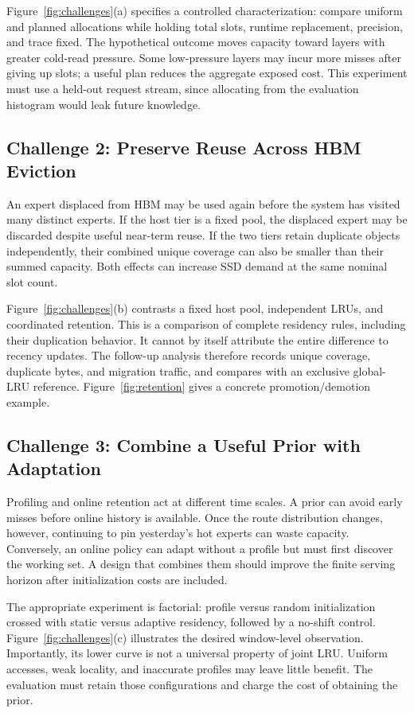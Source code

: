 \documentclass[conference,9pt,letterpaper]{IEEEtran}
\begin{document}
Figure~\ref{fig:challenges}(a) specifies a controlled characterization: compare uniform and planned allocations while holding total slots, runtime replacement, precision, and trace fixed. The hypothetical outcome moves capacity toward layers with greater cold-read pressure. Some low-pressure layers may incur more misses after giving up slots; a useful plan reduces the aggregate exposed cost. This experiment must use a held-out request stream, since allocating from the evaluation histogram would leak future knowledge.

\subsection{Challenge 2: Preserve Reuse Across HBM Eviction}
An expert displaced from HBM may be used again before the system has visited many distinct experts. If the host tier is a fixed pool, the displaced expert may be discarded despite useful near-term reuse. If the two tiers retain duplicate objects independently, their combined unique coverage can also be smaller than their summed capacity. Both effects can increase SSD demand at the same nominal slot count.

Figure~\ref{fig:challenges}(b) contrasts a fixed host pool, independent LRUs, and coordinated retention. This is a comparison of complete residency rules, including their duplication behavior. It cannot by itself attribute the entire difference to recency updates. The follow-up analysis therefore records unique coverage, duplicate bytes, and migration traffic, and compares with an exclusive global-LRU reference. Figure~\ref{fig:retention} gives a concrete promotion/demotion example.

\subsection{Challenge 3: Combine a Useful Prior with Adaptation}
Profiling and online retention act at different time scales. A prior can avoid early misses before online history is available. Once the route distribution changes, however, continuing to pin yesterday's hot experts can waste capacity. Conversely, an online policy can adapt without a profile but must first discover the working set. A design that combines them should improve the finite serving horizon after initialization costs are included.

The appropriate experiment is factorial: profile versus random initialization crossed with static versus adaptive residency, followed by a no-shift control. Figure~\ref{fig:challenges}(c) illustrates the desired window-level observation. Importantly, its lower curve is not a universal property of joint LRU. Uniform accesses, weak locality, and inaccurate profiles may leave little benefit. The evaluation must retain those configurations and charge the cost of obtaining the prior.
\end{document}

